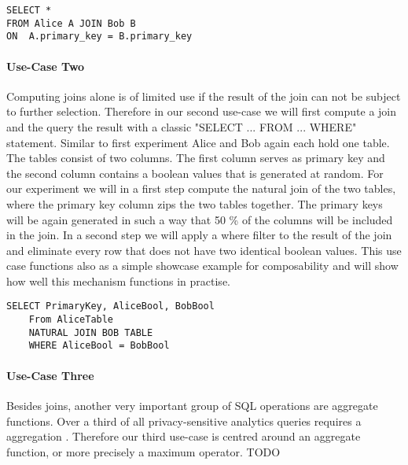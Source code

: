 \label{SQL1_label}				
\begin{lstlisting}[caption={ Functional equivalent SQL statement for our first use-case  }]
SELECT * 
FROM Alice A JOIN Bob B 
ON  A.primary_key = B.primary_key
\end{lstlisting}
\label{SQL1}
			
\paragraph{Use-Case Two}
Computing joins alone is of limited use if the result of the join can not be subject to further selection. Therefore in our second use-case we will first compute a join and the query the result with a classic "SELECT ... FROM ... WHERE" statement. Similar to first experiment Alice and Bob again each hold one table. The tables consist of two columns. The first column serves as primary key and the second column contains a boolean values that is generated at random. For our experiment we will in a first step compute the natural join of the two tables, where the primary key column zips the two tables together. The primary keys will be again generated in such a way that 50 \% of the columns will be included in the join. In a second step we will apply a where filter to the result of the join and eliminate every row that does not have two identical boolean values. This use case functions also as a simple showcase example for composability and will show how well this mechanism functions in practise.    
\begin{lstlisting}[caption={Functional equivalent SQL statement for our second use-case}]
	SELECT PrimaryKey, AliceBool, BobBool
	From AliceTable 
	NATURAL JOIN BOB TABLE
	WHERE AliceBool = BobBool
\end{lstlisting}
\paragraph{Use-Case Three}
Besides joins, another very important group of SQL operations are aggregate functions. Over a third of all privacy-sensitive analytics queries requires a aggregation \cite{johnson2017practical}. Therefore our third use-case is centred around an aggregate function, or more precisely a maximum operator.  TODO
 

